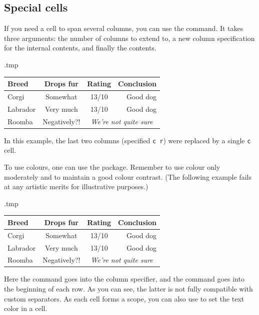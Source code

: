 

%
%
\subsection{Special cells}

If you need a cell to span several columns,
you can use the  command.
It takes three arguments: the number of columns to extend to,
a new column specification for the internal contents, and finally the contents.\label{ex:extrarowheight}
%
\begin{VerbatimOut}{\jobname.tmp}
\setlength\extrarowheight{2pt}
\centering
\begin{tabular}{l| c c @{ $\Rightarrow$ } r}
Breed & Drops fur & Rating & Conclusion\\
\hline
Corgi & Somewhat & 13/10 & Good dog\\
Labrador & Very much & 13/10 & Good dog\\
Roomba & Negatively?! &
    \multicolumn{2}{c}{\emph{We're not quite sure}}
\end{tabular}
\end{VerbatimOut}
\ShowExampleBelow
%
In this example, the last two columns (specified \verb|c r|)
were replaced by a single \verb|c| cell.

To use colours, one can use the  package.
Remember to use colour only moderately and to maintain a good colour contrast.
(The following example fails at any artistic merits for illustrative purposes.)
%
\begin{VerbatimOut}{\jobname.tmp}
\centering
\begin{tabular}{>{\columncolor{green!15}}l | c c @{ $\Rightarrow$ } r}
\rowcolor{blue!15} Breed & Drops fur & Rating & Conclusion\\
\hline
Corgi & Somewhat & 13/10 & Good dog\\
Labrador & Very much & 13/10 & Good dog\\
Roomba & \cellcolor{orange!20} Negatively?! &
    \multicolumn{2}{c}{\emph{We're not quite sure}}
\end{tabular}
\end{VerbatimOut}
\ShowExampleBelow
%
Here the  command goes into the column specifier, and
the  command goes into the beginning of each row.
As you can see, the latter is not fully compatible with custom separators.
As each cell forms a scope, you can also use  to set the text color in a cell.

